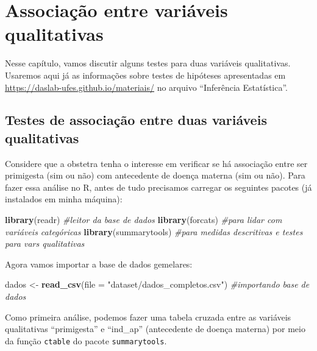 \documentclass[
]{book}
\newenvironment{Shaded}{\begin{snugshade}}{\end{snugshade}}
\newcommand{\CommentTok}[1]{\textcolor[rgb]{0.56,0.35,0.01}{\textit{#1}}}
\newcommand{\DataTypeTok}[1]{\textcolor[rgb]{0.13,0.29,0.53}{#1}}
\newcommand{\KeywordTok}[1]{\textcolor[rgb]{0.13,0.29,0.53}{\textbf{#1}}}
\newcommand{\NormalTok}[1]{#1}
\newcommand{\StringTok}[1]{\textcolor[rgb]{0.31,0.60,0.02}{#1}}
\begin{document}
\hypertarget{qualis}{%
\chapter{Associação entre variáveis qualitativas}\label{qualis}}

Nesse capítulo, vamos discutir alguns testes para duas variáveis qualitativas.
Usaremos aqui já as informações sobre testes de hipóteses apresentadas em \url{https://daslab-ufes.github.io/materiais/} no arquivo ``Inferência Estatística''.

\hypertarget{testes-de-associauxe7uxe3o-entre-duas-variuxe1veis-qualitativas}{%
\section{Testes de associação entre duas variáveis qualitativas}\label{testes-de-associauxe7uxe3o-entre-duas-variuxe1veis-qualitativas}}

Considere que a obstetra tenha o interesse em verificar se há associação entre ser primigesta (sim ou não) com antecedente de doença materna (sim ou não). Para fazer essa análise no R, antes de tudo precisamos carregar os seguintes pacotes (já instalados em minha máquina):

\begin{Shaded}
\begin{Highlighting}[]
\KeywordTok{library}\NormalTok{(readr) }\CommentTok{#leitor da base de dados}
\KeywordTok{library}\NormalTok{(forcats) }\CommentTok{#para lidar com variáveis categóricas}
\KeywordTok{library}\NormalTok{(summarytools) }\CommentTok{#para medidas descritivas e testes para vars qualitativas}
\end{Highlighting}
\end{Shaded}

Agora vamos importar a base de dados gemelares:

\begin{Shaded}
\begin{Highlighting}[]
\NormalTok{dados <-}\StringTok{ }\KeywordTok{read_csv}\NormalTok{(}\DataTypeTok{file =} \StringTok{"dataset/dados_completos.csv"}\NormalTok{) }\CommentTok{#importando base de dados}
\end{Highlighting}
\end{Shaded}

Como primeira análise, podemos fazer uma tabela cruzada entre as variáveis qualitativas ``primigesta'' e ``ind\_ap'' (antecedente de doença materna) por meio da função \texttt{ctable} do pacote \texttt{summarytools}.
\end{document}
